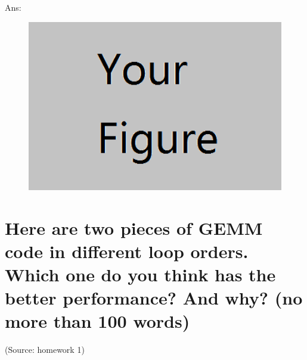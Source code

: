 \documentclass{article}
\begin{document}
Ans:%
\begin{figure}[ht]
\centering
\includegraphics[width=5in]{example.png}
\end{figure}


\section{Here are two pieces of GEMM code in different loop orders. Which one do you think has the better performance? And why? (no more than 100 words)}
\begin{figure}[htbp]
\centering
{}
\end{figure}

(Source: homework 1)
\end{document}
